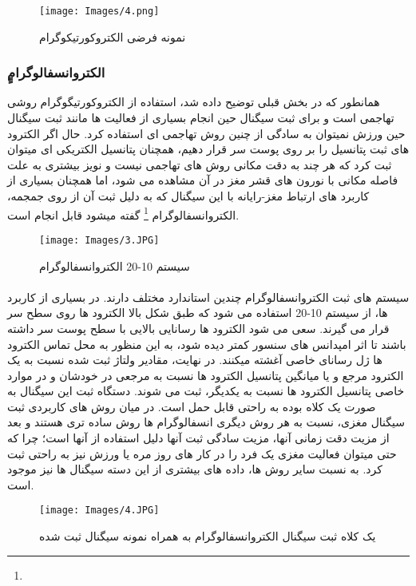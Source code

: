 \documentclass[11pt]{extarticle}
\begin{document}
\begin{figure}[h!]
	\centering
	\texttt{[image: Images/4.png]}
	\caption{نمونه فرضی الکتروکورتیکوگرام}
	\label{fig:6}
\end{figure}

\subsubsection{ٍٍالکتروانسفالوگرام}
همانطور که در بخش قبلی توضیح داده شد، استفاده از الکتروکورتیگوگرام روشی تهاجمی است و برای ثبت سیگنال حین انجام بسیاری از فعالیت ها مانند ثبت سیگنال حین ورزش نمیتوان به سادگی از چنین روش تهاجمی ای استفاده کرد. حال اگر الکترود های ثبت پتانسیل را بر روی پوست سر قرار دهیم، همچنان پتانسیل الکتریکی ای میتوان ثبت کرد که هر چند به دقت مکانی روش های تهاجمی نیست و نویز بیشتری به علت فاصله مکانی با نورون های قشر مغز در آن مشاهده می شود، اما همچنان بسیاری از کاربرد های ارتباط مغز-رایانه با این سیگنال که به دلیل ثبت آن از روی جمجمه، الکتروانسفالوگرام
\footnote{}
 گفته میشود قابل انجام است. 

\begin{figure}[h!]
	\centering
	\texttt{[image: Images/3.JPG]}
	\caption{سیستم 10-20 الکتروانسفالوگرام}
	\label{fig:7}
\end{figure}

\paragraph{}
سیستم های ثبت الکتروانسفالوگرام چندین استاندارد مختلف دارند. در بسیاری از کاربرد ها، از سیستم 10-20 استفاده می شود که طبق شکل بالا الکترود ها روی سطح سر قرار می گیرند. سعی می شود الکترود ها رسانایی بالایی با سطح پوست سر داشته باشند تا اثر امپدانس های سنسور کمتر دیده شود، به این منظور به محل تماس الکترود ها ژل رسانای خاصی آغشته میکنند. در نهایت، مقادیر ولتاژ ثبت شده نسبت به یک الکترود مرجع و یا میانگین پتانسیل الکترود ها نسبت به مرجعی در خودشان و در موارد خاصی پتانسیل الکترود ها نسبت به یکدیگر، ثبت می شوند. دستگاه ثبت این سیگنال به صورت یک کلاه بوده به راحتی قابل حمل است. در میان روش های کاربردی ثبت سیگنال مغزی، نسبت به هر روش دیگری انسفالوگرام ها روش ساده تری هستند و بعد از مزیت دقت زمانی آنها، مزیت سادگی ثبت آنها دلیل استفاده از آنها است؛ چرا که حتی میتوان فعالیت مغزی یک فرد را در کار های روز مره یا ورزش نیز به راحتی ثبت کرد. به نسبت سایر روش ها، داده های بیشتری از این دسته سیگنال ها نیز موجود است.

\begin{figure}[h!]
	\centering
	\texttt{[image: Images/4.JPG]}
	\caption{یک کلاه ثبت سیگنال الکتروانسفالوگرام به همراه نمونه سیگنال ثبت شده}
	\label{fig:8}
\end{figure}
\end{document}
